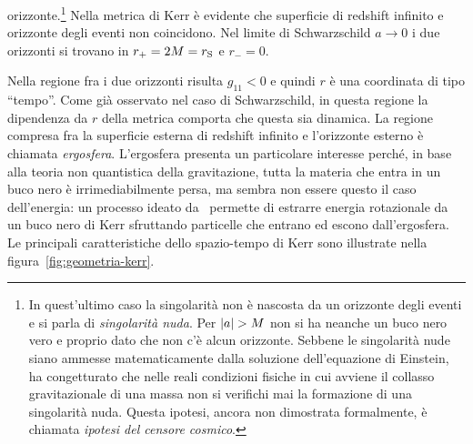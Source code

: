 orizzonte.\footnote{In quest'ultimo caso la singolarità non è nascosta da un
  orizzonte degli eventi e si parla di \emph{singolarità nuda}.  Per \(\lvert a\rvert >
  M\) non si ha neanche un buco nero vero e proprio dato che non c'è alcun
  orizzonte.  Sebbene le singolarità nude siano ammesse matematicamente dalla
  soluzione dell'equazione di Einstein, \textcite{1969NCimR...1..252P} ha
  congetturato che nelle reali condizioni fisiche in cui avviene il collasso
  gravitazionale di una massa non si verifichi mai la formazione di una
  singolarità nuda.  Questa ipotesi, ancora non dimostrata formalmente, è
  chiamata \emph{ipotesi del censore cosmico}.}  Nella metrica di Kerr è
evidente che superficie di redshift infinito e orizzonte degli eventi non
coincidono.  Nel limite di Schwarzschild \(a\to 0\) i due orizzonti si trovano
in \(r_{+} = 2M = r_{\textup{S}}\) e \(r_{-} = 0\).

Nella regione fra i due orizzonti risulta \(g_{11} < 0\) e quindi \(r\) è una
coordinata di tipo ``tempo''.  Come già osservato nel caso di Schwarzschild, in
questa regione la dipendenza da \(r\) della metrica comporta che questa sia
dinamica.  La regione compresa fra la superficie esterna di redshift infinito e
l'orizzonte esterno è chiamata \emph{ergosfera}.  L'ergosfera presenta un
particolare interesse perché, in base alla teoria non quantistica della
gravitazione, tutta la materia che entra in un buco nero è irrimediabilmente
persa, ma sembra non essere questo il caso dell'energia: un processo ideato
da~\textcite{1969NCimR...1..252P} permette di estrarre energia rotazionale da un
buco nero di Kerr sfruttando particelle che entrano ed escono dall'ergosfera.
Le principali caratteristiche dello spazio-tempo di Kerr sono illustrate nella
figura~\ref{fig:geometria-kerr}.

